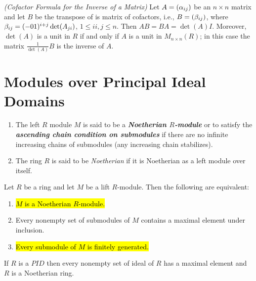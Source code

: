 \nl

\begin{thm}\textit{(Cofactor Formula for the Inverse of a Matrix)} Let $A = (\alpha_{ij})$ be an $n\times n$ matrix and let $B$ be the transpose of is matrix of cofactors, i.e., $B = (\beta_{ij})$, where $\beta_{ij} = (-01)^{i + j}\det(A_{ji})$, $1\leq ii,j\leq n$. Then $AB = BA = \det(A)I$. Moreover, $\det(A)$ is a unit in $R$ if and only if $A$ is a unit in $M_{n\times n}(R)$; in this case the matrix $\frac{1}{\det(A)} B$ is the inverse of $A$.
\end{thm}

\section{Modules over Principal Ideal Domains}
\setcounter{thm}{0}

\begin{defn}\nl
\begin{enumerate}
\item The left $R$ module $M$ is said to be a \textit{\textbf{Noetherian $R$-module}} or to satisfy the \textit{\textbf{ascending chain condition on submodules}} if there are no infinite increasing chains of submodules (any increasing chain stabilizes).
\item The ring $R$ is said to be \textit{Noetherian} if it is Noetherian as a left module over itself.
\end{enumerate}
\end{defn}

\nl

\begin{thm}
Let $R$ be a ring and let $M$ be a lift $R$-module. Then the following are equivalent:
\begin{enumerate}
\item \hl{$M$ is a Noetherian $R$-module.}
\item Every nonempty set of submodules of $M$ contains a maximal element under inclusion.
\item \hl{Every submodule of $M$ is finitely generated.}
\end{enumerate}
\end{thm}

\nl

\begin{cor}
If $R$ is a $PID$ then every nonempty set of ideal of $R$ has a maximal element and $R$ is a Noetherian ring.
\end{cor}

